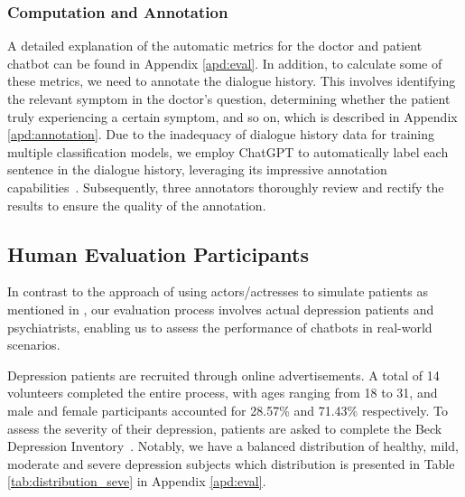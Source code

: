 \subsubsection{Computation and Annotation}
A detailed explanation of the automatic metrics for the doctor and patient chatbot can be found in Appendix \ref{apd:eval}. 
In addition, to calculate some of these metrics, we need to annotate the dialogue history. This involves identifying the relevant symptom in the doctor's question, determining whether the patient truly experiencing a certain symptom, and so on, which is described in Appendix \ref{apd:annotation}.
Due to the inadequacy of dialogue history data for training multiple classification models, we employ ChatGPT to automatically label each sentence in the dialogue history, leveraging its impressive annotation capabilities~\cite{Gilardi2023ChatGPTOC}. Subsequently, three annotators thoroughly review and rectify the results to ensure the quality of the annotation.

\subsection{Human Evaluation Participants}
In contrast to the approach of using actors/actresses to simulate patients as mentioned in \citet{yao-etal-2022-d4}, our evaluation process involves actual depression patients and psychiatrists, enabling us to assess the performance of chatbots in real-world scenarios.

Depression patients are recruited through online advertisements.
A total of 14 volunteers completed the entire process, with ages ranging from 18 to 31, and male and female participants accounted for 28.57\% and 71.43\% respectively. 
To assess the severity of their depression, patients are asked to complete the Beck Depression Inventory~\cite{beck1996beck}. Notably, we have a balanced distribution of healthy, mild, moderate and severe depression subjects which distribution is presented in Table \ref{tab:distribution_seve} in Appendix \ref{apd:eval}.


